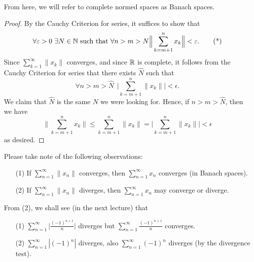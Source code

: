 \documentclass[a4paper]{article}
\begin{document}
From here, we will refer to complete normed spaces as Banach spaces.

\begin{proof}
    By the Cauchy Criterion for series, it suffices to show that 
    \[  \forall \varepsilon > 0 \ \exists N \in \mathbb{N} \ \text{such that} \ \forall n > m > N \Big\|\sum_{ k=m+1 }^{ n } {x}_{k }\Big\| < \varepsilon. \tag{*} \]
    Since \( \sum_{ k=1  }^{ \infty   } \|{x}_{k }\|  \) converges, and since \( \mathbb{R}  \) is complete, it follows from the Cauchy Criterion for series that there exists \( \hat{N} \) such that 
    \[ \forall n> m > \hat{N} \ \ \Big| \sum_{ k= m +1 }^{ n  } \|{x}_{k }\| \Big| < \epsilon.  \]
    We claim that \( \hat{N} \) is the same \( N  \) we were looking for. Hence, if \( n > m > \hat{N} \), then we have
    \[  \Big\| \sum_{ k=m+1 }^{ n  } {x}_{k }  \Big\| \leq \sum_{ k= m+1 }^{ n  } \| {x}_{k} \| = \Big|  \sum_{ k= m+1 }^{ n  } \|{x}_{k }\| \Big|  < \epsilon  \]
    as desired.
\end{proof}

Please take note of the following observations: 

\begin{enumerate}
    \item[(1)] If \( \sum_{ n=1  }^{ \infty  } \|{x}_{n}\| \) converges, then \( \sum_{ n=1  }^{ \infty  } {x}_{n} \) converges (in Banach spaces).
    \item[(2)] If \( \sum_{ n=1  }^{ \infty  } \|{x}_{n}\|  \) diverges, then \( \sum_{ n=1  }^{ \infty  } {x}_{n} \) may converge or diverge.
\end{enumerate}

From (2), we shall see (in the next lecture) that
\begin{enumerate}
    \item[(1)] \( \sum_{ n=1  }^{ \infty  } \Big| \frac{ (-1)^{n+1} }{ n }  \Big|   \) diverges but \( \sum_{ n=1  }^{ \infty   } \frac{ (-1)^{n+1} }{ n }   \) converges.
    \item[(2)] \( \sum_{ n=1  }^{ \infty  } | (-1)^{n} |  \) diverges, also \( \sum_{ n=1  }^{ \infty  } (-1)^{n} \) diverges (by the divergence test).
\end{enumerate}
\end{document}
